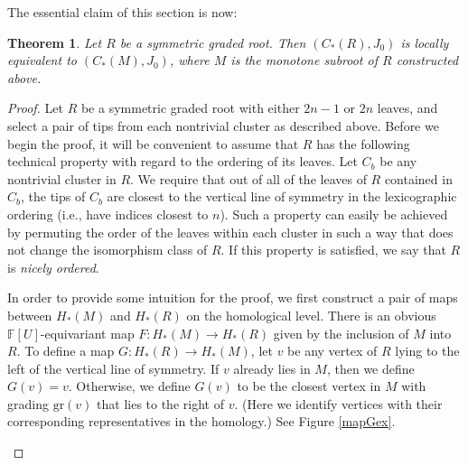 \documentclass[11 pt]{amsart}
\newtheorem {theorem}{Theorem}[section]
\theoremstyle{remark}
\def\gr{\mathrm{gr}}
\begin{document}
The essential claim of this section is now:

\begin{theorem}\label{thm:monotonesubroot}
Let $R$ be a symmetric graded root. Then $(C_*(R), J_0)$ is locally equivalent to $(C_*(M), J_0)$, where $M$ is the monotone subroot of $R$ constructed above.
\end{theorem}
\begin{proof}
Let $R$ be a symmetric graded root with either $2n-1$ or $2n$ leaves, and select a pair of tips from each nontrivial cluster as described above. Before we begin the proof, it will be convenient to assume that $R$ has the following technical property with regard to the ordering of its leaves. Let $C_b$ be any nontrivial cluster in $R$. We require that out of all of the leaves of $R$ contained in $C_b$, the tips of $C_b$ are closest to the vertical line of symmetry in the lexicographic ordering (i.e., have indices closest to $n$). Such a property can easily be achieved by permuting the order of the leaves within each cluster in such a way that does not change the isomorphism class of $R$. If this property is satisfied, we say that $R$ is {\em nicely ordered}.

In order to provide some intuition for the proof, we first construct a pair of maps between $H_*(M)$ and $H_*(R)$ on the homological level. There is an obvious $\mathbb{F}[U]$-equivariant map $F : H_*(M) \rightarrow H_*(R)$ given by the inclusion of $M$ into $R$. To define a map $G: H_*(R) \rightarrow H_*(M)$, let $v$ be any vertex of $R$ lying to the left of the vertical line of symmetry. If $v$ already lies in $M$, then we define $G(v) = v$. Otherwise, we define $G(v)$ to be the closest vertex in $M$ with grading $\gr(v)$ that lies to the right of $v$. (Here we identify vertices with their corresponding representatives in the homology.) See Figure \ref{mapGex}. 

\begin{figure}[h!]
\end{figure}
\end{proof}
\end{document}
